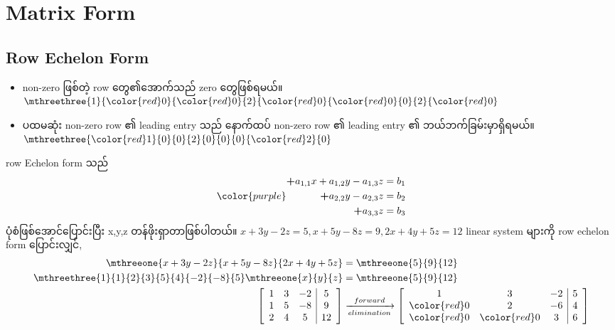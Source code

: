 \section{Matrix Form}
\subsection{Row Echelon Form}
\begin{itemize}
    \item non-zero ဖြစ်တဲ့ row တွေ၏အောက်သည် zero တွေဖြစ်ရမယ်။$\mthreethree{1}{{\color{red}0}}{{\color{red}0}}{2}{{\color{red}0}}{{\color{red}0}}{0}{2}{{\color{red}0}}$
    \item ပထမဆုံး non-zero row ၏ leading entry သည် နောက်ထပ် non-zero row ၏ leading entry ၏ ဘယ်ဘက်ခြမ်းမှာရှိရမယ်။$\mthreethree{{\color{red}1}}{0}{0}{2}{0}{0}{0}{{\color{red}2}}{0}$
\end{itemize}
row Echelon form သည်
\begin{equation}
    {\color{purple}\begin{split}
        {\textbf{+}}a_{1,1}x+a_{1,2}y-a_{1,3}z&=b_1 \\
        {\textbf{+}}a_{2,2}y-a_{2,3}z&=b_2 \\
        {\textbf{+}}a_{3,3}z&=b_3 \\
    \end{split}}
\end{equation}
ပုံစံဖြစ်အောင်ပြောင်းပြီး x,y,z တန်ဖိုးရှာတာဖြစ်ပါတယ်။
$x+3y-2z=5, x+5y-8z=9, 2x+4y+5z=12$ linear system များကို row echelon form ပြောင်းလျှင်,
\[
    \begin{split}
        \mthreeone{x+3y-2z}{x+5y-8z}{2x+4y+5z}&=\mthreeone{5}{9}{12} \\
        \mthreethree{1}{1}{2}{3}{5}{4}{-2}{-8}{5}\mthreeone{x}{y}{z}&=\mthreeone{5}{9}{12} \\
        \hspace{5mm}\left[\begin{array}{c c c | c}
            1 & 3 & -2 & 5 \\
            1 & 5 & -8 & 9 \\
            2 & 4 & 5 & 12
        \end{array}\right]&\xrightarrow[elimination]{forward}\left[\begin{array}{c c c | c}
            1 & 3 & -2 & 5 \\
            {\color{red}0} & 2 & -6 & 4 \\
            {\color{red}0} & {\color{red}0} & 3 & 6
        \end{array}\right]
    \end{split}
\]
